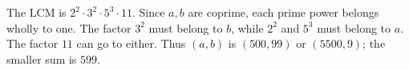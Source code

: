 The LCM is $2^2\cdot3^2\cdot5^3\cdot11$. Since $a,b$ are coprime, each prime power belongs wholly to one. The factor $3^2$ must belong to $b$, while $2^2$ and $5^3$ must belong to $a$. The factor $11$ can go to either. Thus $(a,b)$ is $(500,99)$ or $(5500,9)$; the smaller sum is $\boxed{599}$.
